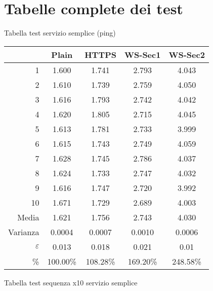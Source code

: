 \clearpage{\pagestyle{empty}\cleardoublepage}
\chapter{Tabelle complete dei test} 
\label{appendiceTest} 

Tabella test servizio semplice (ping)\\

\begin{small}\begin{longtable}{|r|c|c|c|c|}
\hline\hline
&Plain&HTTPS&WS-Sec1&WS-Sec2\\
\hline\hline
1&1.600&1.741&2.793&4.043\\
\hline
2&1.610&1.739&2.759&4.050\\
\hline
3&1.616&1.793&2.742&4.042\\
\hline
4&1.620&1.805&2.715&4.045\\
\hline
5&1.613&1.781&2.733&3.999\\
\hline
6&1.615&1.743&2.749&4.059\\
\hline
7&1.628&1.745&2.786&4.037\\
\hline
8&1.624&1.733&2.747&4.032\\
\hline
9&1.616&1.747&2.720&3.992\\
\hline
10&1.671&1.729&2.689&4.003\\
\hline\hline
Media&1.621&1.756&2.743&4.030\\
\hline
Varianza&0.0004&0.0007&0.0010&0.0006\\
\hline
$\varepsilon$&0.013&0.018&0.021&0.01\\
\hline
\%&100.00\%&108.28\%&169.20\%&248.58\%\\
\hline\hline
\end{longtable}\end{small}

Tabella test sequenza x10 servizio semplice\\

